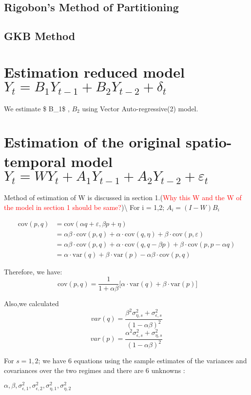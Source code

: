 \documentclass[
  12pt,
]{article}
\begin{document}
\subsection{Rigobon's Method of Partitioning}

\subsection{GKB Method}

\section{\textbf{\textcolor{DeepBlue}{Estimation reduced model $  Y_t = B_1 Y_{t-1} + B_2 Y_{t-2} + \delta_t $}}}

We estimate \$ B\_1\$ , \(B_2\) using Vector Auto-regressive(2) model.

\section{\textbf{\textcolor{DeepBlue}{Estimation of the original spatio-temporal model $ Y_t = WY_t + A_1 Y_{t-1} + A_2 Y_{t-2} + \varepsilon_t $}}}

Method of estimation of W is discussed in section
1.(\textcolor{red}{Why this W and the W of the model in section 1 should be same?})\textbackslash{}
For i = 1,2; \(A_i = (I-W)B_i\)

\begin{align*}
    \text{cov}(p,q) &= \text{cov}(\alpha q + \varepsilon , \beta p + \eta)\\
    &= \alpha\beta\cdot\text{cov}(p,q) + \alpha\cdot\text{cov}(q,\eta) + \beta\cdot\text{cov}(p,\varepsilon)\\
    &= \alpha\beta\cdot\text{cov}(p,q) + \alpha\cdot\text{cov}(q,q - \beta p) + \beta\cdot\text{cov}(p,p - \alpha q)\\
    &= \alpha\cdot\text{var}(q) + \beta\cdot\text{var}(p) - \alpha\beta\cdot\text{cov}(p,q)
\end{align*}

Therefore, we have:
\[~\text{cov}(p,q) = \dfrac{1}{1+\alpha\beta}\Big[\alpha\cdot\text{var}(q) + \beta\cdot\text{var}(p)\Big] \]

Also,we calculated
\[var(q) = \frac{\beta^2 \sigma^2_{\eta,s} + \sigma^2_{\epsilon,s}}{(1-\alpha \beta)^2} \]
\[var(p) = \frac{\alpha^2 \sigma^2_{\epsilon,s} + \sigma^2_{\eta,s}}{(1-\alpha \beta)^2}\]

For \(s=1,2\); we have 6 equations using the sample estimates of the
variances and covariances over the two regimes and there are 6 unknowns
:

\(\alpha, \beta, \sigma^2_{\epsilon,1}, \sigma^2_{\epsilon,2}, \sigma^2_{\eta,1}, \sigma^2_{\eta,2}\)
\end{document}
